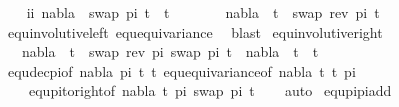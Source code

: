 \begin{isabellebody}
\isanewline
\ \ \isakeywordONE{{\isacharbraceleft}{\kern0pt}}\isamarkupfalse%
\isamarkupfalse%
\ ii{\isacharcolon}{\kern0pt}\ {\isachardoublequoteopen}nabla\ {\isasymturnstile}\ swap\ pi\ t{}\ {\isasymapprox}\ t{}{\isachardoublequoteclose}\isanewline
\ \ \ \ \isamarkupfalse%
\ \isamarkupfalse%
\ {\isachardoublequoteopen}nabla\ {\isasymturnstile}\ t{}\ {\isasymapprox}\ swap\ {\isacharparenleft}{\kern0pt}rev\ pi{\isacharparenright}{\kern0pt}\ t{}{\isachardoublequoteclose}\isanewline
\ \ \ \ \ \ \isamarkupfalse%
\ equ{\isacharunderscore}{\kern0pt}involutive{\isacharunderscore}{\kern0pt}left\ equ{\isacharunderscore}{\kern0pt}equivariance\ \isamarkupfalse%
\ blast\isakeywordONE{{\isacharbraceright}{\kern0pt}}\isamarkupfalse%
\isanewline
{}\isamarkupfalse%
%
\endisatagproof
{\isafoldproof}%
%
\isadelimproof
\isanewline
%
\endisadelimproof
\isanewline
{}\isamarkupfalse%
\ equ{\isacharunderscore}{\kern0pt}involutive{\isacharunderscore}{\kern0pt}right{\isacharcolon}{\kern0pt}\ \isanewline
\ \ \ {\isachardoublequoteopen}nabla\ {\isasymturnstile}\ t{}\ {\isasymapprox}\ swap\ {\isacharparenleft}{\kern0pt}rev\ pi{\isacharparenright}{\kern0pt}\ {\isacharparenleft}{\kern0pt}swap\ pi\ t{}{\isacharparenright}{\kern0pt}\ {\isacharequal}{\kern0pt}\ nabla\ {\isasymturnstile}\ t{}\ {\isasymapprox}\ t{}{\isachardoublequoteclose}\isanewline
%
\isadelimproof
\ \ %
\endisadelimproof
%
\isatagproof
{}\isamarkupfalse%
\ equ{\isacharunderscore}{\kern0pt}dec{\isacharunderscore}{\kern0pt}pi{\isacharbrackleft}{\kern0pt}of\ nabla\ pi\ t{}\ t{}{\isacharbrackright}{\kern0pt}\ equ{\isacharunderscore}{\kern0pt}equivariance{\isacharbrackleft}{\kern0pt}of\ nabla\ t{}\ t{}\ pi{\isacharbrackright}{\kern0pt}\ \isanewline
\ \ \ \ equ{\isacharunderscore}{\kern0pt}pi{\isacharunderscore}{\kern0pt}to{\isacharunderscore}{\kern0pt}right{\isacharbrackleft}{\kern0pt}of\ nabla\ t{}\ pi\ {\isacartoucheopen}swap\ pi\ t{}{\isacartoucheclose}{\isacharbrackright}{\kern0pt}\isanewline
\ \ \isamarkupfalse%
\ auto%
\endisatagproof
{\isafoldproof}%
%
\isadelimproof
\isanewline
%
\endisadelimproof
\isanewline
{}\isamarkupfalse%
\ equ{\isacharunderscore}{\kern0pt}pi{}{\isacharunderscore}{\kern0pt}pi{}{\isacharunderscore}{\kern0pt}add{\isacharcolon}{\kern0pt}\ \isanewline

\end{isabellebody}
